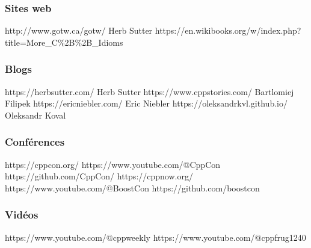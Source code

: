 \documentclass[C++.tex]{subfiles}
\begin{document}
\begin{frame}[fragile]
	\frametitle{Sites web}
		{http://www.gotw.ca/gotw/}
		{Herb Sutter}
		{https://en.wikibooks.org/w/index.php?title=More_C\%2B\%2B_Idioms}
\end{frame}

\begin{frame}[fragile]
	\frametitle{Blogs}
		{https://herbsutter.com/}
		{Herb Sutter}
		{https://www.cppstories.com/}
		{Bartlomiej Filipek}
		{https://ericniebler.com/}
		{Eric Niebler}
		{https://oleksandrkvl.github.io/}
		{Oleksandr Koval}
\end{frame}

\begin{frame}[fragile]
	\frametitle{Conférences}
		{https://cppcon.org/}
		{https://www.youtube.com/@CppCon}
		{https://github.com/CppCon/}
		{https://cppnow.org/}
		{https://www.youtube.com/@BoostCon}
		{https://github.com/boostcon}
\end{frame}

\begin{frame}[fragile]
	\frametitle{Vidéos}
		{https://www.youtube.com/@cppweekly}
		{https://www.youtube.com/@cppfrug1240}
\end{frame}
\end{document}
